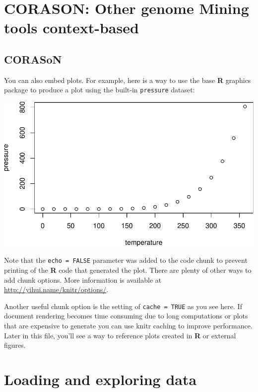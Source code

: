 \documentclass[12pt,twoside]{reedthesis}
\begin{document}
  \section{CORASON: Other genome Mining tools
  context-based}\label{corason-other-genome-mining-tools-context-based}
  
  \subsection{CORASoN}\label{corason}
  
  You can also embed plots. For example, here is a way to use the base
  \textbf{R} graphics package to produce a plot using the built-in
  \texttt{pressure} dataset:
  
  \begin{center}\includegraphics{tesis_files/figure-latex/pressure-1} \end{center}
  
  Note that the \texttt{echo\ =\ FALSE} parameter was added to the code
  chunk to prevent printing of the \textbf{R} code that generated the
  plot. There are plenty of other ways to add chunk options. More
  information is available at \url{http://yihui.name/knitr/options/}.
  
  Another useful chunk option is the setting of \texttt{cache\ =\ TRUE} as
  you see here. If document rendering becomes time consuming due to long
  computations or plots that are expensive to generate you can use knitr
  caching to improve performance. Later in this file, you'll see a way to
  reference plots created in \textbf{R} or external figures.
  
  \section{Loading and exploring data}\label{loading-and-exploring-data}
  
\end{document}
